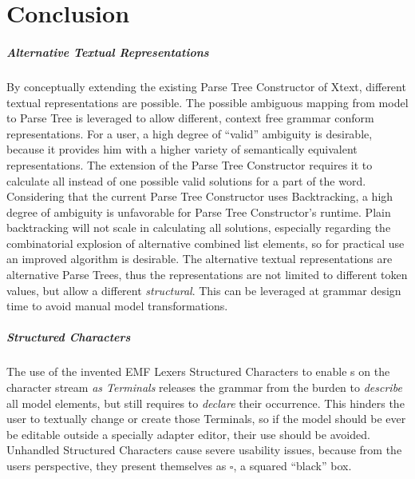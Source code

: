 \chapter{Conclusion}
\paragraph{Alternative Textual Representations}
By conceptually extending the existing Parse Tree Constructor of Xtext, different textual representations are possible. The possible ambiguous mapping from model to Parse Tree is leveraged to allow different, context free grammar conform representations. For a user, a high degree of ``valid'' ambiguity is desirable, because it provides him with a higher variety of semantically equivalent representations. The extension of the Parse Tree Constructor requires it to calculate all instead of one possible valid solutions for a part of the word. Considering that the current Parse Tree Constructor uses Backtracking, a high degree of ambiguity is unfavorable for Parse Tree Constructor's runtime. Plain backtracking will not scale in calculating all solutions, especially regarding the combinatorial explosion of alternative combined list elements, so for practical use an improved algorithm is desirable. The alternative textual representations are alternative Parse Trees, thus the representations are not limited to different token values, but allow a different \emph{structural}. This can be leveraged at grammar design time to avoid manual model transformations. 

\paragraph{Structured Characters}
The use of the invented EMF Lexers Structured Characters to enable s on the character stream \emph{as Terminals} releases the grammar from the burden to \emph{describe} all model elements, but still requires to \emph{declare} their occurrence. This hinders the user to textually change or create those  Terminals, so if the model should be ever be editable outside a specially adapter editor, their use should be avoided. Unhandled Structured Characters cause severe usability issues, because from the users perspective, they present themselves as $\square$, a squared ``black'' box.

